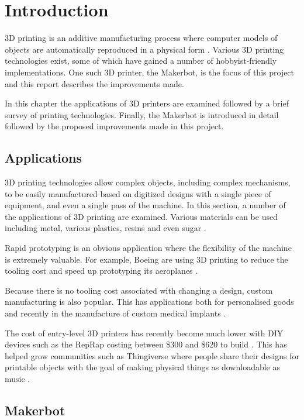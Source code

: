 \chapter{Introduction}
	
	3D printing is an additive manufacturing process where computer models of
	objects are automatically reproduced in a physical form
	\cite{additivemanufacturing}. Various 3D printing technologies exist, some of
	which have gained a number of hobbyist-friendly implementations. One such 3D
	printer, the Makerbot, is the focus of this project and this report describes
	the improvements made.
	
	In this chapter the applications of 3D printers are examined followed by a
	brief survey of printing technologies. Finally, the Makerbot is introduced in
	detail followed by the proposed improvements made in this project.
	
	\section{Applications}
		
		3D printing technologies allow complex objects, including complex
		mechanisms, to be easily manufactured based on digitized designs with a
		single piece of equipment, and even a single pass of the machine. In this
		section, a number of the applications of 3D printing are examined. Various
		materials can be used including metal, various plastics, resins and even
		sugar \cite{candyfab}.
		
		Rapid prototyping is an obvious application where the flexibility of the
		machine is extremely valuable. For example, Boeing are using 3D printing to
		reduce the tooling cost and speed up prototyping its aeroplanes
		\cite{boeing3dprint}.
		
		Because there is no tooling cost associated with changing a design, custom
		manufacturing is also popular. This has applications both for personalised
		goods and recently in the manufacture of custom medical implants \cite{jaw}.
		
		The cost of entry-level 3D printers has recently become much lower with DIY
		devices such as the RepRap costing between \$300 and \$620 to build
		\cite{costsdown,reprap}. This has helped grow communities such as
		Thingiverse where people share their designs for printable objects with the
		goal of making physical things as downloadable as music \cite{thingiverse}.
	
	\section{Makerbot}
		
